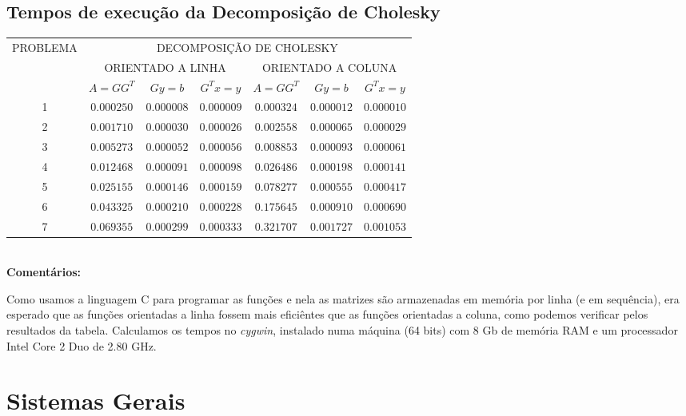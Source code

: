 \documentclass[a4paper,11pt]{article}
\begin{document}
\subsection{Tempos de execução da Decomposição de Cholesky}

\begin{table}[htb]
	\label{tab:inters}
	\large
	\centering
	\begin{tabular}{|c|c|c|c||c|c|c|}
		\hline
		\multirow{3}{*}{PROBLEMA} & \multicolumn{6}{|c|}{DECOMPOSIÇÃO DE CHOLESKY} \\
		\cline{2-7}
		& \multicolumn{3}{|c||}{ORIENTADO A LINHA} & \multicolumn{3}{|c|}{ORIENTADO A COLUNA} \\
		\cline{2-7}
		& $A=GG^{T}$ & $Gy=b$ & $G^{T}x=y$ & $A=GG^{T}$ & $Gy=b$ & $G^{T}x=y$ \\
		\hline
		\hline
		1 & $0.000250$ & $0.000008$ & $0.000009$ & $0.000324$ & $0.000012$ & $0.000010$ \\
		2 & $0.001710$ & $0.000030$ & $0.000026$ & $0.002558$ & $0.000065$ & $0.000029$ \\
		3 & $0.005273$ & $0.000052$ & $0.000056$ & $0.008853$ & $0.000093$ & $0.000061$ \\
		4 & $0.012468$ & $0.000091$ & $0.000098$ & $0.026486$ & $0.000198$ & $0.000141$ \\
		5 & $0.025155$ & $0.000146$ & $0.000159$ & $0.078277$ & $0.000555$ & $0.000417$ \\
		6 & $0.043325$ & $0.000210$ & $0.000228$ & $0.175645$ & $0.000910$ & $0.000690$ \\
		7 & $0.069355$ & $0.000299$ & $0.000333$ & $0.321707$ & $0.001727$ & $0.001053$ \\
		\hline
	\end{tabular}
\end{table}
\  \\
{\bf Comentários:} 

Como usamos a linguagem C para programar as funções e nela as matrizes são armazenadas em memória por linha (e em sequência), era esperado que as funções orientadas a linha fossem mais eficiêntes que as funções orientadas a coluna, como podemos verificar pelos resultados da tabela. Calculamos os tempos no {\it cygwin}, instalado numa máquina (64 bits) com 8 Gb de memória RAM e um processador Intel Core 2 Duo de 2.80 GHz. 

\section{Sistemas Gerais}
\end{document}
